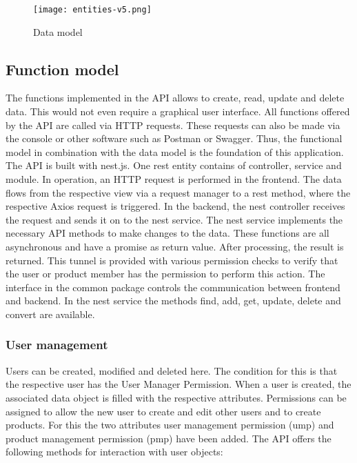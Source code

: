    \begin{figure*}[t]
        \centering
        \texttt{[image: entities-v5.png]}
        \caption{Data model}
        \label{fig: datamodel}
    \end{figure*}

    \subsection*{Function model} 
    The functions implemented in the API allows to create, read, update and delete data. This would not even require a graphical user interface. All functions offered by the API are called via HTTP requests. These requests can also be made via the console or other software such as Postman or Swagger. Thus, the functional model in combination with the data model is the foundation of this application. The API is built with nest.js. One rest entity contains of controller, service and module. In operation, an HTTP request is performed in the frontend. The data flows from the respective view via a request manager to a rest method, where the respective Axios request is triggered. In the backend, the nest controller receives the request and sends it on to the nest service. The nest service implements the necessary API methods to make changes to the data. These functions are all asynchronous and have a promise as return value. After processing, the result is returned. This tunnel is provided with various permission checks to verify that the user or product member has the permission to perform this action. The interface in the common package controls the communication between frontend and backend. In the nest service the methods find, add, get, update, delete and convert are available. 

    \subsubsection*{User management}
    Users can be created, modified and deleted here. The condition for this is that the respective user has the User Manager Permission. When a user is created, the associated data object is filled with the respective attributes. Permissions can be assigned to allow the new user to create and edit other users and to create products. For this the two attributes user management permission (ump) and product management permission (pmp) have been added. The API offers the following methods for interaction with user objects:
    
